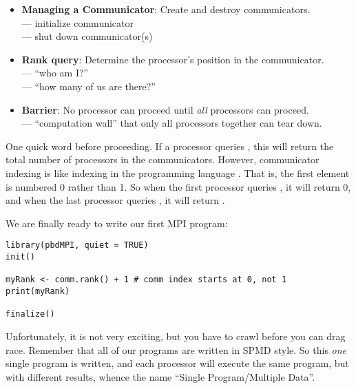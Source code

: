 \begin{itemize}
  \item \textbf{Managing a Communicator}:  Create and destroy communicators.\\
         --- initialize communicator\\
         --- shut down communicator(s)
  \item \textbf{Rank query}: Determine the processor's position in the
         communicator.\\
         --- ``who am I?''\\
         --- ``how many of us are there?''
  \item \textbf{Barrier}: No processor can proceed until \emph{all} processors
        can proceed.\\
         --- ``computation wall'' that only all processors
        together can tear down.
\end{itemize}


One quick word before proceeding. If a processor queries
, this will return the total number of processors in
the communicators. However, communicator indexing is like indexing in
the programming language . That is, the first element is
numbered 0 rather than 1. So when the first processor queries
, it will return 0, and when the last processor
queries , it will return .
  
We are finally ready to write our first MPI program:

\begin{lstlisting}[language=rr,title=Simple pbdMPI Example 1]
library(pbdMPI, quiet = TRUE)
init()

myRank <- comm.rank() + 1 # comm index starts at 0, not 1
print(myRank)

finalize()
\end{lstlisting}

Unfortunately, it is not very exciting, but you have to crawl before you
can drag race. Remember that all of our programs are written in SPMD style.
So this \emph{one} single program is written, and each processor will
execute the same program, but with different results, whence the name
``Single Program/Multiple Data''.

